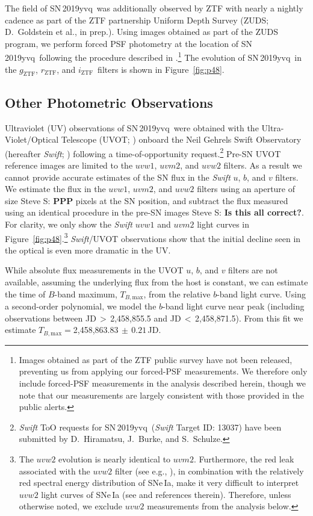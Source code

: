\documentclass[twocolumn]{aastex63}
\newcommand{\steve}[1]{{\color{DarkCyan} Steve S: \textbf{#1}}}
\newcommand{\rztf}{$r_\mathrm{ZTF}$}
\newcommand{\gztf}{$g_\mathrm{ZTF}$}
\newcommand{\iztf}{$i_\mathrm{ZTF}$}
\newcommand{\tbmax}{$T_{B,\mathrm{max}}$}
\newcommand{\sn}{SN\,2019yvq}
\begin{document}
The field of \sn\ was additionally observed by ZTF with nearly a nightly
cadence as part of the ZTF partnership Uniform Depth Survey (ZUDS;
D.~Goldstein et al., in prep.). Using images obtained as part of the ZUDS
program, we perform forced PSF photometry at the location of \sn\ following
the procedure described in \citet{Yao19}.\footnote{Images obtained as part of
the ZTF public survey have not been released, preventing us from applying our
forced-PSF measurements. We therefore only include forced-PSF measurements in
the analysis described herein, though we note that our measurements are
largely consistent with those provided in the public alerts.} The evolution
of \sn\ in the \gztf, \rztf, and \iztf\ filters is shown in
Figure~\ref{fig:p48}.

\subsection{Other Photometric Observations}

Ultraviolet (UV) observations of \sn\ were obtained with the
Ultra-Violet/Optical Telescope (UVOT; \citealt{Roming05}) onboard the Neil
Gehrels Swift Observatory (hereafter \textit{Swift}; \citealt{Gehrels04})
following a time-of-opportunity request.\footnote{\textit{Swift} ToO
requests for \sn\ (\textit{Swift} Target ID: 13037) have been submitted by
D.~Hiramatsu, J.~Burke, and S.~Schulze.}
Pre-SN UVOT reference images are limited to the $uvw1$, $uvm2$, and $uvw2$
filters. As a result we cannot provide accurate estimates of the SN flux in
the \textit{Swift} $u$, $b$, and $v$ filters. We estimate the flux in the
$uvw1$, $uvm2$, and $uvw2$ filters using an aperture of size \steve{PPP}
pixels at the SN position, and subtract the flux measured using an identical
procedure in the pre-SN images \steve{Is this all correct?}. For clarity, we
only show the \textit{Swift} $uvw1$ and $uvm2$ light curves in
Figure~\ref{fig:p48}.\footnote{The $uvw2$ evolution is nearly identical to
$uvm2$. Furthermore, the red leak associated with the $uvw2$ filter (see
e.g., \citealt{Breeveld11}), in combination with the relatively red spectral
energy distribution of SNe\,Ia, make it very difficult to interpret $uvw2$
light curves of SNe\,Ia (see \citealt{Brown17} and references therein).
Therefore, unless otherwise noted, we exclude $uvw2$ measurements from the
analysis below.} \textit{Swift}/UVOT observations show that the initial
decline seen in the optical is even more dramatic in the UV.

While absolute flux measurements in the UVOT $u$, $b$, and $v$ filters are
not available, assuming the underlying flux from the host is constant, we
can estimate the time of $B$-band maximum, \tbmax, from the relative
$b$-band light curve. Using a second-order polynomial, we model the $b$-band
light curve near peak (including observations between JD$\,> \,$2,458,855.5
and JD$\,<\,$2,458,871.5). From this fit we estimate \tbmax$ =
$2,458,863.83$ \,\pm \,0.21$\,JD.
\end{document}
